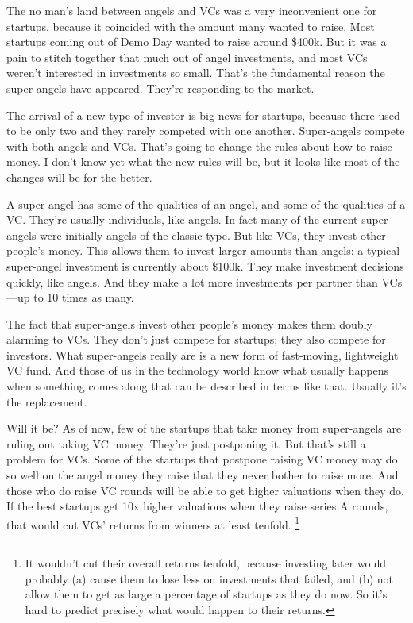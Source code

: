 \documentclass[12pt]{book}
\begin{document}
The no man's land between angels and VCs was a very inconvenient one for
startups, because it coincided with the amount many wanted to raise.
Most startups coming out of Demo Day wanted to raise around \$400k. But
it was a pain to stitch together that much out of angel investments, and
most VCs weren't interested in investments so small. That's the
fundamental reason the super-angels have appeared. They're responding to
the market.

The arrival of a new type of investor is big news for startups, because
there used to be only two and they rarely competed with one another.
Super-angels compete with both angels and VCs. That's going to change
the rules about how to raise money. I don't know yet what the new rules
will be, but it looks like most of the changes will be for the better.

A super-angel has some of the qualities of an angel, and some of the
qualities of a VC. They're usually individuals, like angels. In fact
many of the current super-angels were initially angels of the classic
type. But like VCs, they invest other people's money. This allows them
to invest larger amounts than angels: a typical super-angel investment
is currently about \$100k. They make investment decisions quickly, like
angels. And they make a lot more investments per partner than VCs---up
to 10 times as many.

The fact that super-angels invest other people's money makes them doubly
alarming to VCs. They don't just compete for startups; they also compete
for investors. What super-angels really are is a new form of
fast-moving, lightweight VC fund. And those of us in the technology
world know what usually happens when something comes along that can be
described in terms like that. Usually it's the replacement.

Will it be? As of now, few of the startups that take money from
super-angels are ruling out taking VC money. They're just postponing it.
But that's still a problem for VCs. Some of the startups that postpone
raising VC money may do so well on the angel money they raise that they
never bother to raise more. And those who do raise VC rounds will be
able to get higher valuations when they do. If the best startups get 10x
higher valuations when they raise series A rounds, that would cut VCs'
returns from winners at least tenfold. \footnote{It wouldn't cut their overall returns tenfold, because investing
later would probably (a) cause them to lose less on investments that
failed, and (b) not allow them to get as large a percentage of startups
as they do now. So it's hard to predict precisely what would happen to
their returns.}
\end{document}

